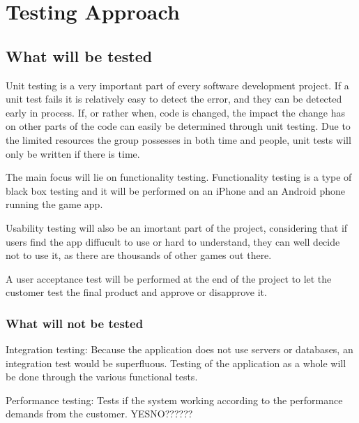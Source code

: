 \section{Testing Approach}

\subsection{What will be tested}

Unit testing is a very important part of every software development project. If a unit test fails it is relatively easy to detect the error, and they can be detected early in process. If, or rather when, code is changed, the impact the change has on other parts of the code can easily be determined through unit testing. Due to the limited resources
the group possesses in both time and people, unit tests will only be written if there is time. 

The main focus will lie on functionality testing. Functionality testing is a type of black box testing and it will be performed on an iPhone and an Android phone running the game app.

Usability testing will also be an imortant part of the project, considering that if users find the app diffucult to use or hard to understand, they can well decide not to use it, as there are thousands of other games out there.

A user acceptance test will be performed at the end of the project to let the customer test the final product and
approve or disapprove it.

\subsubsection{What will not be tested}


Integration testing: Because the application does not use servers or databases, an integration test would be superfluous. Testing of the application as a whole will be done through the various functional tests.

Performance testing: Tests if the system working according to the performance demands from the customer. YESNO??????